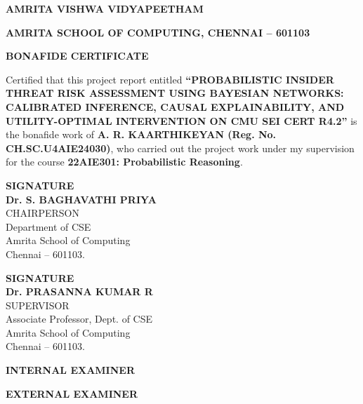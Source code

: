 \documentclass[12pt,a4paper]{report}
\begin{document}
\setcounter{page}{2}

\newpage
\begin{center}
{\fontsize{14}{17}\bfseries AMRITA VISHWA VIDYAPEETHAM\par}
{\fontsize{12}{15}\bfseries AMRITA SCHOOL OF COMPUTING, CHENNAI -- 601103\par}
\vspace{1.5cm}
{\fontsize{13}{16}\bfseries BONAFIDE CERTIFICATE\par}
\end{center}

\vspace{1.0cm}
\noindent Certified that this project report entitled \textbf{``PROBABILISTIC INSIDER THREAT RISK ASSESSMENT USING BAYESIAN NETWORKS: CALIBRATED INFERENCE, CAUSAL EXPLAINABILITY, AND UTILITY-OPTIMAL INTERVENTION ON CMU SEI CERT R4.2''} is the bonafide work of \textbf{A. R. KAARTHIKEYAN (Reg. No. CH.SC.U4AIE24030)}, who carried out the project work under my supervision for the course \textbf{22AIE301: Probabilistic Reasoning}.

\vspace{3.5cm}
\noindent
\begin{minipage}{0.48\textwidth}
\textbf{SIGNATURE}\\[1.5cm]
\textbf{Dr. S. BAGHAVATHI PRIYA}\\
CHAIRPERSON\\
Department of CSE\\
Amrita School of Computing\\
Chennai -- 601103.
\end{minipage}
\hfill
\begin{minipage}{0.48\textwidth}
\textbf{SIGNATURE}\\[1.5cm]
\textbf{Dr. PRASANNA KUMAR R}\\
SUPERVISOR\\
Associate Professor, Dept. of CSE\\
Amrita School of Computing\\
Chennai -- 601103.
\end{minipage}

\vspace{2.5cm}
\noindent
\begin{minipage}{0.48\textwidth}
\textbf{INTERNAL EXAMINER}
\end{minipage}
\hfill
\begin{minipage}{0.48\textwidth}
\textbf{EXTERNAL EXAMINER}
\end{minipage}
\end{document}
